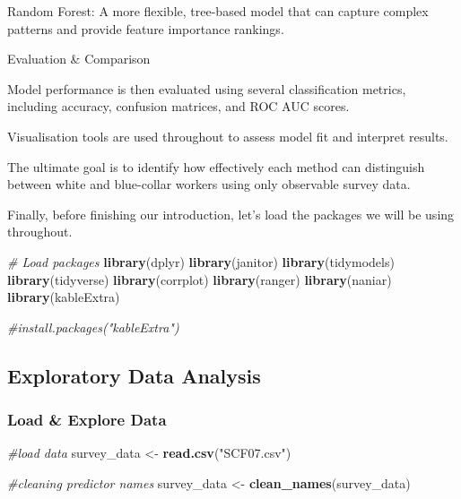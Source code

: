 \documentclass[
]{article}
\newenvironment{Shaded}{\begin{snugshade}}{\end{snugshade}}
\newcommand{\CommentTok}[1]{\textcolor[rgb]{0.56,0.35,0.01}{\textit{#1}}}
\newcommand{\FunctionTok}[1]{\textcolor[rgb]{0.13,0.29,0.53}{\textbf{#1}}}
\newcommand{\NormalTok}[1]{#1}
\newcommand{\OtherTok}[1]{\textcolor[rgb]{0.56,0.35,0.01}{#1}}
\newcommand{\StringTok}[1]{\textcolor[rgb]{0.31,0.60,0.02}{#1}}
\begin{document}
Random Forest: A more flexible, tree-based model that can capture
complex patterns and provide feature importance rankings.

Evaluation \& Comparison

Model performance is then evaluated using several classification
metrics, including accuracy, confusion matrices, and ROC AUC scores.

Visualisation tools are used throughout to assess model fit and
interpret results.

The ultimate goal is to identify how effectively each method can
distinguish between white and blue-collar workers using only observable
survey data.

Finally, before finishing our introduction, let's load the packages we
will be using throughout.

\begin{Shaded}
\begin{Highlighting}[]
\CommentTok{\# Load packages}
\FunctionTok{library}\NormalTok{(dplyr)}
\FunctionTok{library}\NormalTok{(janitor)}
\FunctionTok{library}\NormalTok{(tidymodels)}
\FunctionTok{library}\NormalTok{(tidyverse)}
\FunctionTok{library}\NormalTok{(corrplot)}
\FunctionTok{library}\NormalTok{(ranger)}
\FunctionTok{library}\NormalTok{(naniar)}
\FunctionTok{library}\NormalTok{(kableExtra)}

\CommentTok{\#install.packages("kableExtra")}
\end{Highlighting}
\end{Shaded}

\subsection{Exploratory Data Analysis}\label{exploratory-data-analysis}

\subsubsection{Load \& Explore Data}\label{load-explore-data}

\begin{Shaded}
\begin{Highlighting}[]
\CommentTok{\#load data}
\NormalTok{survey\_data }\OtherTok{\textless{}{-}} \FunctionTok{read.csv}\NormalTok{(}\StringTok{"SCF07.csv"}\NormalTok{) }

\CommentTok{\#cleaning predictor names}
\NormalTok{survey\_data }\OtherTok{\textless{}{-}} \FunctionTok{clean\_names}\NormalTok{(survey\_data)}
\end{Highlighting}
\end{Shaded}
\end{document}
